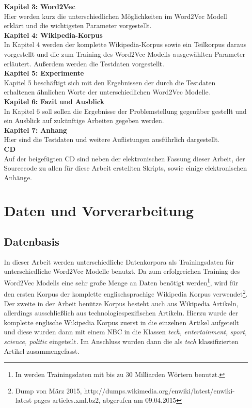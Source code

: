 \documentclass[12pt,a4paper]{report}
\begin{document}
	\textbf{Kapitel 3: Word2Vec}\\
	Hier werden kurz die unterschiedlichen Möglichkeiten im Word2Vec Modell erklärt und die wichtigsten Parameter vorgestellt.\\
	
	\textbf{Kapitel 4: Wikipedia-Korpus}\\
	In Kapitel 4 werden der komplette Wikipedia-Korpus sowie ein Teilkorpus daraus vorgestellt und die zum Training des Word2Vec Modells ausgewählten Parameter erläutert. Außerdem werden die Testdaten vorgestellt.\\
	
	\textbf{Kapitel 5: Experimente}\\
	Kapitel 5 beschäftigt sich mit den Ergebnissen der durch die Testdaten erhaltenen ähnlichen Worte der unterschiedlichen Word2Vec Modelle.\\
	
	\textbf{Kapitel 6: Fazit und Ausblick}\\
	In Kapitel 6 soll sollen die Ergebnisse der Problemstellung gegenüber gestellt und ein Ausblick auf zukünftige Arbeiten gegeben werden.\\
	
	\textbf{Kapitel 7: Anhang}\\
	Hier sind die Testdaten und weitere Auflistungen ausführlich dargestellt.\\
	
	\textbf{CD}\\
	Auf der beigefügten CD sind neben der elektronischen Fassung dieser Arbeit, der Sourcecode zu allen für diese Arbeit erstellten Skripts, sowie einige elektronischen Anhänge.

\newpage
\chapter{Daten und Vorverarbeitung}
	\section{Datenbasis}
	In dieser Arbeit werden unterschiedliche Datenkorpora als Trainingsdaten für unterschiedliche Word2Vec Modelle benutzt. Da zum erfolgreichen Training des Word2Vec Modells eine sehr große Menge an Daten benötigt werden\footnote{In \cite{DBLP:journals/corr/MikolovSCCD13} werden Trainingsdaten mit bis zu 30 Milliarden Wörtern benutzt.}, wird für den ersten Korpus der komplette englischsprachige Wikipedia Korpus verwendet\footnote{Dump von März 2015, http://dumps.wikimedia.org/enwiki/latest/enwiki-latest-pages-articles.xml.bz2, abgerufen am 09.04.2015}. Der zweite in der Arbeit benütze Korpus besteht auch aus Wikipedia Artikeln, allerdings ausschließlich aus technologiespezifischen Artikeln. Hierzu wurde der komplette englische Wikipedia Korpus zuerst in die einzelnen Artikel aufgeteilt und diese wurden dann mit einem NBC in die Klassen \textit{tech, entertainment, sport, science, politic} eingeteilt. Im Anschluss wurden dann die als \textit{tech} klassifizierten Artikel zusammengefasst.
	
\end{document}
